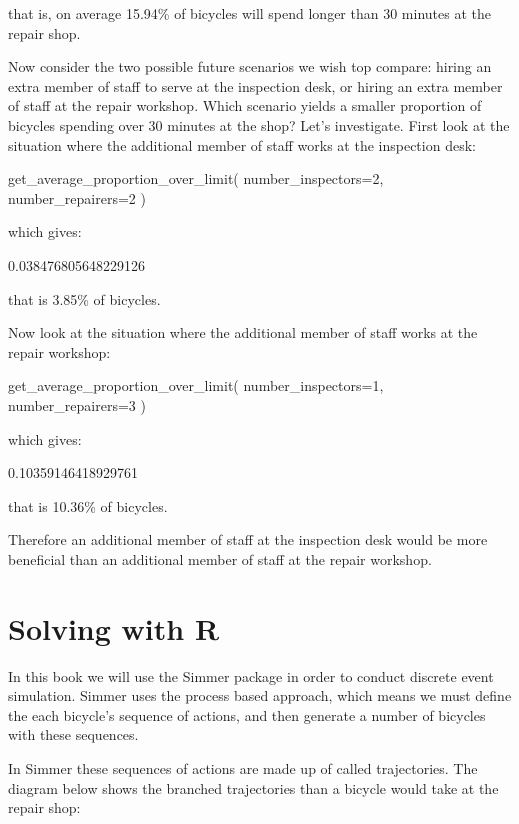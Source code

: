 that is, on average 15.94\% of bicycles will spend longer than 30 minutes at the
repair shop.

Now consider the two possible future scenarios we wish top compare: hiring an
extra member of staff to serve at the inspection desk, or hiring an extra member
of staff at the repair workshop. Which scenario yields a smaller proportion of
bicycles spending over 30 minutes at the shop? Let's investigate. First look at
the situation where the additional member of staff works at the inspection desk:

\begin{pyin}
get_average_proportion_over_limit(
    number_inspectors=2, number_repairers=2
)
\end{pyin}

which gives:

\begin{pyout}
0.038476805648229126
\end{pyout}

that is 3.85\% of bicycles.

Now look at the situation where the additional member of staff works at the
repair workshop:

\begin{pyin}
get_average_proportion_over_limit(
    number_inspectors=1, number_repairers=3
)
\end{pyin}

which gives:

\begin{pyout}
0.10359146418929761
\end{pyout}

that is 10.36\% of bicycles.

Therefore an additional member of staff at the inspection desk would be more
beneficial than an additional member of staff at the repair workshop.


\section{Solving with R}\label{sec:solving-with-R}

In this book we will use the Simmer package in order to conduct discrete event
simulation.
Simmer uses the process based approach, which means we must define the each
bicycle's sequence of actions, and then generate a number of bicycles with these
sequences.

In Simmer these sequences of actions are made up of called trajectories. The
diagram below shows the branched trajectories than a bicycle would take at the
repair shop:

